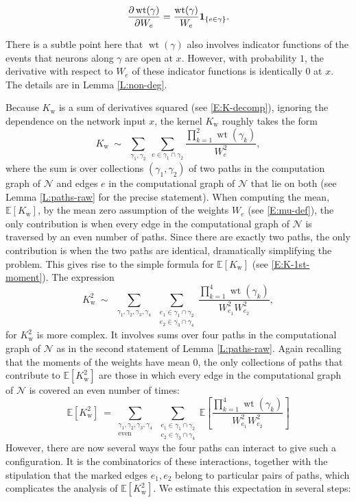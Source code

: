 \documentclass[11pt, reqno]{amsart}
\newcommand{\E}[1]{{\mathbb E}\left [#1\right]}
\newcommand{\e}{\mathbb E}
\newcommand{\mN}{\mathcal N}
\newcommand{\Kw}{K_{\mathrm{w}}}
\DeclareMathOperator{\wt}{wt}
\begin{document}
\begin{equation} \label{E:deriv}
\frac{\partial \wt(\gamma)}{\partial W_{e}} = \frac{\wt(\gamma)}{W_{e}} {\bf 1}_{\{e \in \gamma\}}.
\end{equation}

\noindent There is a subtle point here that $\wt(\gamma)$ also involves indicator functions of the events that neurons along $\gamma$ are open at $x.$ However, with probability $1$, the derivative with respect to $W_e$ of these indicator functions is identically $0$ at $x.$ The details are in Lemma \ref{L:non-deg}.

Because $\Kw$ is a sum of derivatives squared (see \eqref{E:K-decomp}), ignoring the dependence on the network input $x$, the kernel $\Kw$ roughly takes the form 
 \[\Kw~\sim~ \sum_{\substack{ \gamma_1,\gamma_2}} \sum_{e\in \gamma_1\cap \gamma_2} \frac{\prod_{k=1}^2 \wt(\gamma_k)}{W_{e}^2},\]
where the sum is over collections $(\gamma_1,\gamma_2)$ of two paths in the computation graph of $\mN$ and edges $e$ in the computational graph of $\mN$ that lie on both (see Lemma \ref{L:paths-raw} for the precise statement).  When computing the mean, $\e[\Kw]$, by the mean zero assumption of the weights $W_e$ (see \eqref{E:mu-def}), the only contribution is when every edge in the computational graph of $\mN$ is traversed by an even number of paths. Since there are exactly two paths, the only contribution is when the two paths are identical, dramatically simplifying the problem. This gives rise to the simple formula for $\e[\Kw]$ (see \eqref{E:K-1st-moment}). The expression 
 \[\Kw^2~\sim~ \sum_{\substack{ \gamma_1,\gamma_2,\gamma_3,\gamma_4}} \sum_{\substack{e_1\in \gamma_1\cap \gamma_2\\e_2\in \gamma_3\cap \gamma_4}} \frac{\prod_{k=1}^4 \wt(\gamma_k)}{W_{e_1}^2W_{e_2}^2},\]
for $\Kw^2$ is more complex. It involves sums over four paths in the computational graph of $\mN$ as in the second statement of Lemma \ref{L:paths-raw}. Again recalling that the moments of the weights have mean $0$, the only collections of paths that contribute to  $\e[\Kw^2]$ are those in which every edge in the computational graph of $\mN$ is covered an even number of times:
\begin{equation}\label{E:Kw2-rough}
\e[\Kw^2]~=\sum_{\substack{ \gamma_1,\gamma_2,\gamma_3,\gamma_4\\\mathrm{even}}} \sum_{\substack{e_1\in \gamma_1\cap \gamma_2\\e_2\in \gamma_3\cap \gamma_4}} \E{\frac{\prod_{k=1}^4 \wt(\gamma_k)}{W_{e_1}^2W_{e_2}^2}}
\end{equation}
However, there are now several ways the four paths can interact to give such a configuration. It is the combinatorics of these interactions, together with the stipulation that the marked edges $e_1,e_2$ belong to particular pairs of paths, which complicates the analysis of $\e[\Kw^2].$ We estimate this expectation in several steps:
\end{document}
